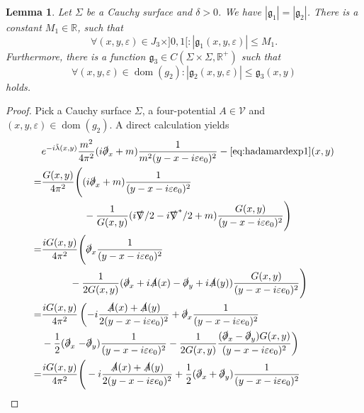 \documentclass[b5paper,draft,openbib,12pt]{memoir}
\newtheorem{Lemma}[Def]{Lemma}
\DeclareMathOperator{\dom}{dom}
\begin{document}
\begin{Lemma}\label{lem:bound,worstterm}
Let \(\Sigma\) be a Cauchy surface and \(\delta>0\). 
We have \(|\mathfrak{g}_1|=|\mathfrak{g}_2|\).
There is a constant \(M_1\in\mathbb{R}\), such that
\begin{equation}
 \forall (x,y,\varepsilon)\in J_3\times]0,1[ :|\mathfrak{g}_1(x,y,\varepsilon)|\le M_1.
\end{equation}
Furthermore, there is a function 
\(\mathfrak{g}_3 \in C(\Sigma\times\Sigma,\mathbb{R}^+)\) such that
\begin{equation}
\forall (x,y,\varepsilon)\in \dom(g_2): |\mathfrak{g}_2(x,y,\varepsilon)|\le \mathfrak{g}_3(x,y)
\end{equation}
holds.
\end{Lemma}
\begin{proof}
Pick a Cauchy surface \(\Sigma\), a four-potential 
\(A \in \mathcal{V}\) and \((x,y,\varepsilon)\in \dom(g_2)\).
A direct calculation yields
\begin{align}
&e^{-i\tilde{\lambda}(x,y)} \frac{m^2}{4\pi^2} (i\slashed{\partial}_x+m)\frac{1}{m^2(y-x-i\varepsilon e_0)^2} -\eqref{eq:hadamardexp1}(x,y)\\\nonumber
=&\frac{G(x,y)}{4\pi^2} \Bigg( (i \slashed{\partial}_x +m) \frac{1}{(y-x-i \varepsilon e_0)^2}\\
&\hspace{1.5cm} -\frac{1}{G(x,y)}(i \slashed{\nabla}/2 - i \slashed{\nabla}^*/2 +m) \frac{G(x,y)}{(y-x-i\varepsilon e_0)^2}\Bigg)\\\nonumber
=&\frac{iG(x,y)}{4\pi^2}  \Bigg( \slashed{\partial}_x \frac{1}{(y-x-i \varepsilon e_0)^2} \\
&\hspace{1cm}-\frac{1}{2G(x,y)}(\slashed{\partial}_x + i \slashed{A}(x) - \slashed{\partial}_y + i \slashed{A}(y) ) \frac{G(x,y)}{(y-x-i\varepsilon e_0)^2}\Bigg)\\\nonumber
=&\frac{iG(x,y)}{4\pi^2} \left(-i\frac{\slashed{A}(x) + \slashed{A}(y)}{2 (y-x-i\varepsilon e_0)^2} + \slashed{\partial}_x \frac{1}{(y-x-i \varepsilon e_0)^2}\right. \\
&-\frac{1}{2}(\slashed{\partial}_x\left.- \slashed{\partial}_y ) \frac{1}{(y-x-i\varepsilon e_0)^2}-\frac{1}{2G(x,y)} \frac{(\slashed{\partial}_x- \slashed{\partial}_y )G(x,y)}{(y-x-i\varepsilon e_0)^2}\right)\\\nonumber
=&\frac{iG(x,y)}{4\pi^2}  \Bigg(-i\frac{\slashed{A}(x) + \slashed{A}(y)}{2 (y-x-i\varepsilon e_0)^2} +\frac{1}{2}(\slashed{\partial}_x+ \slashed{\partial}_y ) \frac{1}{(y-x-i\varepsilon e_0)^2}\\

\end{align}
\end{proof}
\end{document}
